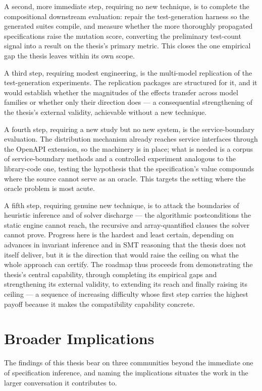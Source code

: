 A second, more immediate step, requiring no new technique, is to complete the
compositional downstream evaluation: repair the test-generation harness so the
generated suites compile, and measure whether the more thoroughly propagated
specifications raise the mutation score, converting the preliminary test-count
signal into a result on the thesis's primary metric. This closes the one empirical
gap the thesis leaves within its own scope.

A third step, requiring modest engineering, is the multi-model replication of
the test-generation experiments. The replication packages are structured for it,
and it would establish whether the magnitudes of the effects transfer across model
families or whether only their direction does --- a consequential strengthening of
the thesis's external validity, achievable without a new technique.

A fourth step, requiring a new study but no new system, is the service-boundary
evaluation. The distribution mechanism already reaches service interfaces through
the OpenAPI extension, so the machinery is in place; what is needed is a corpus of
service-boundary methods and a controlled experiment analogous to the library-code
one, testing the hypothesis that the specification's value compounds where the
source cannot serve as an oracle. This targets the setting where the oracle problem
is most acute.

A fifth step, requiring genuine new technique, is to attack the boundaries of
heuristic inference and of solver discharge --- the algorithmic postconditions the
static engine cannot reach, the recursive and array-quantified clauses the solver
cannot prove. Progress here is the hardest and least certain, depending on advances
in invariant inference and in SMT reasoning that the thesis does not itself
deliver, but it is the direction that would raise the ceiling on what the whole
approach can certify. The roadmap thus proceeds from demonstrating the thesis's
central capability, through completing its empirical gaps and strengthening its
external validity, to extending its reach and finally raising its ceiling --- a
sequence of increasing difficulty whose first step carries the highest payoff
because it makes the compatibility capability concrete.

\section{Broader Implications}

The findings of this thesis bear on three communities beyond the immediate one of
specification inference, and naming the implications situates the work in the
larger conversation it contributes to.

